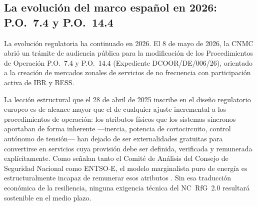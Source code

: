 \subsection{La evolución del marco español en 2026: P.O.~7.4 y P.O.~14.4}
\label{subsec:cnmc_2026}

La evolución regulatoria ha continuado en 2026. El 8 de mayo de 2026,
la CNMC abrió un trámite de audiencia pública para la modificación de los
Procedimientos de Operación P.O.~7.4 y P.O.~14.4 (Expediente
DCOOR/DE/006/26), orientado a la creación de mercados zonales de
servicios de no frecuencia con participación activa de IBR y BESS.

La lección estructural que el 28 de abril de 2025 inscribe en el diseño
regulatorio europeo es de alcance mayor que el de cualquier ajuste
incremental a los procedimientos de operación: los atributos físicos que
los sistemas síncronos aportaban de forma inherente ---inercia, potencia
de cortocircuito, control autónomo de tensión--- han dejado de ser
externalidades gratuitas para convertirse en servicios cuya provisión
debe ser definida, verificada y remunerada explícitamente. Como señalan
tanto el Comité de Análisis del Consejo de Seguridad Nacional como
ENTSO-E, el modelo marginalista puro de energía es estructuralmente
incapaz de remunerar esos atributos \cite{gobierno2025,entsoe2025}. Sin
esa traducción económica de la resiliencia, ninguna exigencia técnica
del NC~RfG~2.0 resultará sostenible en el medio plazo.